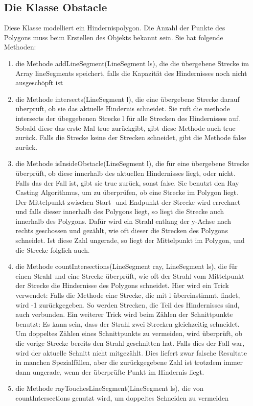 \documentclass[a4paper,10pt,ngerman]{scrartcl}
\begin{document}
\subsection{Die Klasse Obstacle}
Diese Klasse modelliert ein Hindernispolygon. Die Anzahl der Punkte des Polygons muss beim Erstellen des Objekts bekannt sein. Sie hat folgende Methoden:
\begin{enumerate}
\item die Methode addLineSegment(LineSegment ls), die die übergebene Strecke im Array lineSegments speichert, falls die Kapazität des Hindernisses noch nicht ausgeschöpft ist
\item die Methode intersects(LineSegment l), die eine übergebene Strecke darauf überprüft, ob sie das aktuelle Hindernis schneidet. Sie ruft die methode intersects der übeggebenen Strecke l für alle Strecken des Hindernisses auf. Sobald diese das erste Mal true zurückgibt, gibt diese Methode auch true zurück. Falls die Strecke keine der Strecken schneidet, gibt die Methode false zurück.
\item die Methode isInsideObstacle(LineSegment l), die für eine übergebene Strecke überprüft, ob diese innerhalb des aktuellen Hindernisses liegt, oder nicht. Falls das der Fall ist, gibt sie true zurück, sonst false. Sie benutzt den Ray Casting Algorithmus, um zu überprüfen, ob eine Strecke im Polygon liegt. Der Mittelpunkt zwischen Start- und Endpunkt der Strecke wird errechnet und falls dieser innerhalb des Polygons liegt, so liegt die Strecke auch innerhalb des Polygons. Dafür wird ein Strahl entlang der y-Achse nach rechts geschossen und gezählt, wie oft dieser die Strecken des Polygons schneidet. Ist diese Zahl ungerade, so liegt der Mittelpunkt im Polygon, und die Strecke folglich auch. 
\item die Methode countIntersections(LineSegment ray, LineSegment ls), die für einen Strahl und eine Strecke überprüft, wie oft der Strahl vom Mittelpunkt der Strecke die Hindernisse des Polygons schneidet. Hier wird ein Trick verwendet: Falls die Methode eine Strecke, die mit l übereinstimmt, findet, wird -1 zurückgegeben. So werden Strecken, die Teil des Hindernisses sind, auch verbunden. Ein weiterer Trick wird beim Zählen der Schnittpunkte benutzt: Es kann sein, dass der Strahl zwei Strecken gleichzeitig schneidet. Um doppeltes Zählen eines Schnittpunkts zu vermeiden, wird überprüft, ob die vorige Strecke bereits den Strahl geschnitten hat. Falls dies der Fall war, wird der aktuelle Schnitt nicht mitgezählt. Dies liefert zwar falsche Resultate in manchen Spezialfällen, aber die zurückgegebene Zahl ist trotzdem immer dann ungerade, wenn der überprüfte Punkt im Hindernis liegt.
\item die Methode rayTouchesLineSegment(LineSegment ls), die von countIntersections genutzt wird, um doppeltes Schneiden zu vermeiden

\end{enumerate}
\end{document}
